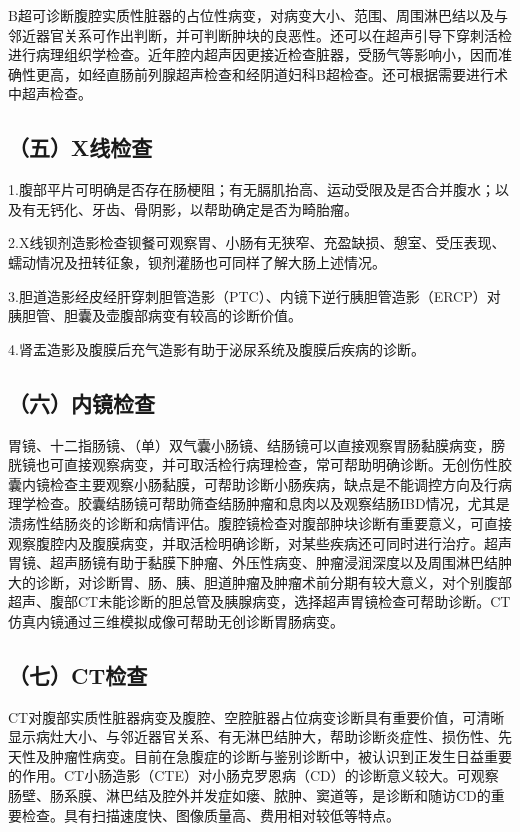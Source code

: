 B超可诊断腹腔实质性脏器的占位性病变，对病变大小、范围、周围淋巴结以及与邻近器官关系可作出判断，并可判断肿块的良恶性。还可以在超声引导下穿刺活检进行病理组织学检查。近年腔内超声因更接近检查脏器，受肠气等影响小，因而准确性更高，如经直肠前列腺超声检查和经阴道妇科B超检查。还可根据需要进行术中超声检查。

\subsection{（五）X线检查}

1.腹部平片可明确是否存在肠梗阻；有无膈肌抬高、运动受限及是否合并腹水；以及有无钙化、牙齿、骨阴影，以帮助确定是否为畸胎瘤。

2.X线钡剂造影检查钡餐可观察胃、小肠有无狭窄、充盈缺损、憩室、受压表现、蠕动情况及扭转征象，钡剂灌肠也可同样了解大肠上述情况。

3.胆道造影经皮经肝穿刺胆管造影（PTC）、内镜下逆行胰胆管造影（ERCP）对胰胆管、胆囊及壶腹部病变有较高的诊断价值。

4.肾盂造影及腹膜后充气造影有助于泌尿系统及腹膜后疾病的诊断。

\subsection{（六）内镜检查}

胃镜、十二指肠镜、（单）双气囊小肠镜、结肠镜可以直接观察胃肠黏膜病变，膀胱镜也可直接观察病变，并可取活检行病理检查，常可帮助明确诊断。无创伤性胶囊内镜检查主要观察小肠黏膜，可帮助诊断小肠疾病，缺点是不能调控方向及行病理学检查。胶囊结肠镜可帮助筛查结肠肿瘤和息肉以及观察结肠IBD情况，尤其是溃疡性结肠炎的诊断和病情评估。腹腔镜检查对腹部肿块诊断有重要意义，可直接观察腹腔内及腹膜病变，并取活检明确诊断，对某些疾病还可同时进行治疗。超声胃镜、超声肠镜有助于黏膜下肿瘤、外压性病变、肿瘤浸润深度以及周围淋巴结肿大的诊断，对诊断胃、肠、胰、胆道肿瘤及肿瘤术前分期有较大意义，对个别腹部超声、腹部CT未能诊断的胆总管及胰腺病变，选择超声胃镜检查可帮助诊断。CT仿真内镜通过三维模拟成像可帮助无创诊断胃肠病变。

\subsection{（七）CT检查}

CT对腹部实质性脏器病变及腹腔、空腔脏器占位病变诊断具有重要价值，可清晰显示病灶大小、与邻近器官关系、有无淋巴结肿大，帮助诊断炎症性、损伤性、先天性及肿瘤性病变。目前在急腹症的诊断与鉴别诊断中，被认识到正发生日益重要的作用。CT小肠造影（CTE）对小肠克罗恩病（CD）的诊断意义较大。可观察肠壁、肠系膜、淋巴结及腔外并发症如瘘、脓肿、窦道等，是诊断和随访CD的重要检查。具有扫描速度快、图像质量高、费用相对较低等特点。


